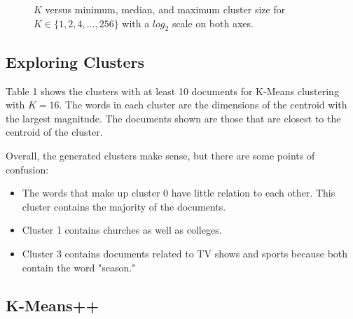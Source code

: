 \documentclass{article} %
\begin{document}
\begin{figure}[h]
\begin{center}
\end{center}
\caption{$K$ versus minimum, median, and maximum cluster size for $K \in \{1,2,4,...,256\}$ with a $log_{2}$ scale on both axes.}
\end{figure}

\subsection{Exploring Clusters}

Table 1 shows the clusters with at least 10 documents for K-Means clustering with $K=16$. The words in each cluster are the dimensions of the centroid with the largest magnitude. The documents shown are those that are closest to the centroid of the cluster.

Overall, the generated clusters make sense, but there are some points of confusion:

\begin{itemize}
\item The words that make up cluster 0 have little relation to each other. This cluster contains the majority of the documents.
\item Cluster 1 contains churches as well as colleges.
\item Cluster 3 contains documents related to TV shows and sports because both contain the word "season."
\end{itemize}

\subsection{K-Means++}
\end{document}
